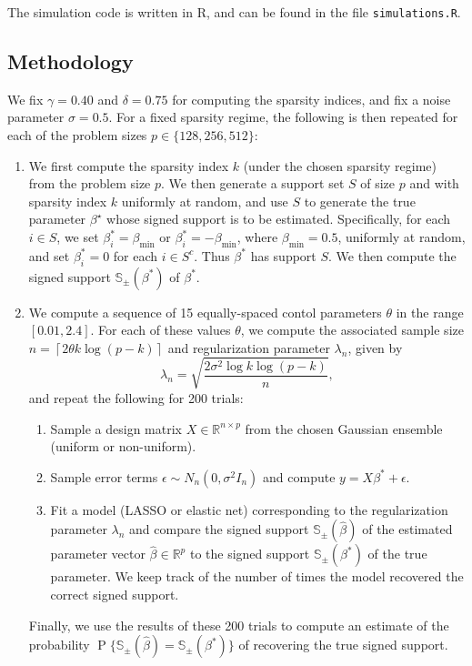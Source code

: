 \documentclass[letterpaper,12pt]{article}
\DeclareMathOperator{\prob}{P}
\newcommand{\ceil}[1]{\left\lceil#1\right\rceil}
\begin{document}
The simulation code is written in R, and can be found in the file
\texttt{simulations.R}.

\subsection*{Methodology}

We fix $\gamma = 0.40$ and $\delta = 0.75$ for computing the sparsity
indices, and fix a noise parameter $\sigma = 0.5$. For a fixed
sparsity regime, the following is then repeated for each of the
problem sizes $p \in \{128, 256, 512\}$:

\begin{enumerate}
\item We first compute the sparsity index $k$ (under the chosen
  sparsity regime) from the problem size $p$. We then generate a
  support set $S$ of size $p$ and with sparsity index $k$ uniformly at
  random, and use $S$ to generate the true parameter $\beta^\star$
  whose signed support is to be estimated. Specifically, for each
  $i \in S$, we set $\beta^\ast_i = \beta_{\mathrm{min}}$ or
  $\beta^\ast_i = -\beta_{\mathrm{min}}$, where
  $\beta_{\mathrm{min}} = 0.5$, uniformly at random, and set
  $\beta^\ast_i = 0$ for each $i \in S^c$. Thus $\beta^\ast$ has
  support $S$. We then compute the signed support
  $\mathbb{S}_\pm(\beta^\ast)$ of $\beta^\ast$.

\item We compute a sequence of 15 equally-spaced contol parameters
  $\theta$ in the range $[0.01, 2.4]$. For each of these values
  $\theta$, we compute the associated sample size
  $n = \ceil{2 \theta k \log(p - k)}$ and regularization parameter
  $\lambda_n$, given by
    \begin{equation*}
      \lambda_n = \sqrt{\frac{2\sigma^2 \log k \log(p - k)}{n}},
    \end{equation*}
    and repeat the following for 200 trials:
  \begin{enumerate}
  \item Sample a design matrix $X \in \mathbb{R}^{n \times p}$ from
    the chosen Gaussian ensemble (uniform or non-uniform).
  \item Sample error terms $\epsilon \sim N_n(0, \sigma^2 I_n)$ and
    compute $y = X\beta^\ast + \epsilon$.
  \item Fit a model (LASSO or elastic net) corresponding to the
    regularization parameter $\lambda_n$ and compare the signed
    support $\mathbb{S}_\pm(\hat{\beta})$ of the estimated parameter
    vector $\hat{\beta} \in \mathbb{R}^p$ to the signed support
    $\mathbb{S}_\pm(\beta^\ast)$ of the true parameter. We keep track
    of the number of times the model recovered the correct signed
    support.
  \end{enumerate}
  Finally, we use the results of these 200 trials to compute an
  estimate of the probability
  $\prob\{\mathbb{S}_\pm(\hat{\beta}) = \mathbb{S}_\pm(\beta^\ast)\}$
  of recovering the true signed support.


\end{enumerate}
\end{document}
